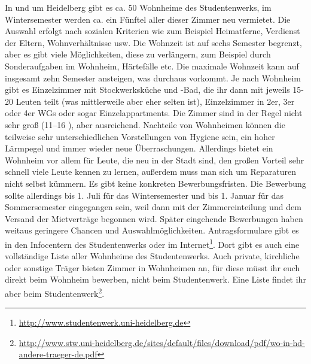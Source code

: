 In und um Heidelberg gibt es ca. 50 Wohnheime des Studentenwerks, im Wintersemester werden ca. ein Fünftel aller dieser Zimmer neu vermietet. Die Auswahl erfolgt nach sozialen Kriterien wie zum Beispiel Heimatferne, Verdienst der Eltern, Wohnverhältnisse usw. Die Wohnzeit ist auf sechs Semester begrenzt, aber es gibt viele Möglichkeiten, diese zu verlängern, zum Beispiel durch Sonderaufgaben im Wohnheim, Härtefälle etc. Die maximale Wohnzeit kann auf insgesamt zehn Semester ansteigen, was durchaus vorkommt. Je nach Wohnheim gibt es Einzelzimmer mit Stockwerksküche und -Bad, die ihr dann mit jeweils 15-20 Leuten teilt (was mittlerweile aber eher selten ist), Einzelzimmer in 2er, 3er oder 4er WGs oder sogar Einzelappartments. Die Zimmer sind in der Regel nicht sehr groß (11--16 \squaren\metre), aber ausreichend. Nachteile von Wohnheimen können die teilweise sehr unterschiedlichen Vorstellungen von Hygiene sein, ein hoher Lärmpegel und immer wieder neue Überraschungen. Allerdings bietet ein Wohnheim vor allem für Leute, die neu in der Stadt sind, den großen Vorteil sehr schnell viele Leute kennen zu lernen, außerdem muss man sich um Reparaturen nicht selbst kümmern. Es gibt keine konkreten Bewerbungsfristen. Die Bewerbung sollte allerdings bis 1. Juli für das Wintersemester und bis 1. Januar für das Sommersemester eingegangen sein, weil dann mit der Zimmereinteilung und dem Versand der Mietverträge begonnen wird. Später eingehende Bewerbungen haben weitaus geringere Chancen und Auswahlmöglichkeiten. Antragsformulare gibt es in den Infocentern des Studentenwerks oder im Internet\footnote{\url{http://www.studentenwerk.uni-heidelberg.de}}. Dort gibt es auch eine vollständige Liste aller Wohnheime des Studentenwerks. Auch private, kirchliche oder sonstige Träger bieten Zimmer in Wohnheimen an, für diese müsst ihr euch direkt beim Wohnheim bewerben, nicht beim Studentenwerk. Eine Liste findet ihr aber beim Studentenwerk\footnote{\url{http://www.stw.uni-heidelberg.de/sites/default/files/download/pdf/wo-in-hd-andere-traeger-de.pdf}}.
